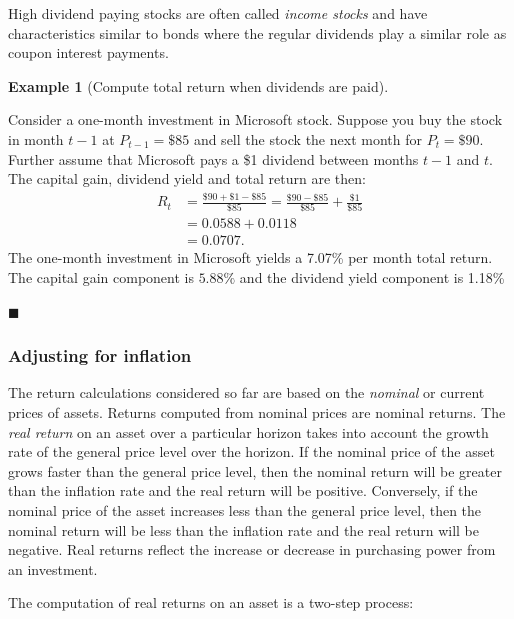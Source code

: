 \documentclass[
  letterpaper,
  DIV=11,
  numbers=noendperiod]{scrreprt}
\theoremstyle{definition}
\theoremstyle{definition}
\newtheorem{example}{Example}[chapter]
\theoremstyle{remark}
\begin{document}
High dividend paying stocks are often called \emph{income stocks} and
have characteristics similar to bonds where the regular dividends play a
similar role as coupon interest payments.

\begin{example}[Compute total return when dividends are
paid]\protect\hypertarget{exm-example0109}{}\label{exm-example0109}

Consider a one-month investment in Microsoft stock. Suppose you buy the
stock in month \(t-1\) at \(P_{t-1}=\$85\) and sell the stock the next
month for \(P_{t}=\$90\). Further assume that Microsoft pays a \$1
dividend between months \(t-1\) and \(t\). The capital gain, dividend
yield and total return are then: \begin{align*}
R_{t} & =\frac{\$90+\$1-\$85}{\$85}=\frac{\$90-\$85}{\$85}+\frac{\$1}{\$85}\\
 & =0.0588+0.0118\\
 & =0.0707.
\end{align*} The one-month investment in Microsoft yields a 7.07\% per
month total return. The capital gain component is \(5.88\%\) and the
dividend yield component is 1.18\%

\hfill{}\(\blacksquare\)

\end{example}

\hypertarget{adjusting-for-inflation}{%
\subsubsection{Adjusting for inflation}\label{adjusting-for-inflation}}

The return calculations considered so far are based on the
\emph{nominal} or current prices of assets. Returns
computed from nominal prices are nominal returns. The \emph{real
return} on an asset over a particular horizon takes
into account the growth rate of the general price level over the
horizon. If the nominal price of the asset grows faster than the general
price level, then the nominal return will be greater than the inflation
rate and the real return will be positive. Conversely, if the nominal
price of the asset increases less than the general price level, then the
nominal return will be less than the inflation rate and the real return
will be negative. Real returns reflect the increase or decrease in
purchasing power from an investment.

The computation of real returns on an asset is a two-step process:
\end{document}
